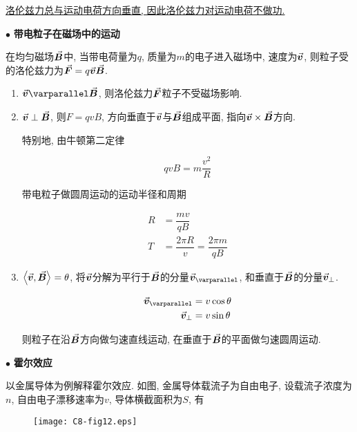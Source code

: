 \underline{洛伦兹力总与运动电荷方向垂直, 因此洛伦兹力对运动电荷不做功. }

\vskip 0.3cm

$\bullet$ \textbf{带电粒子在磁场中的运动}

在均匀磁场$\va*{B}$中, 当带电荷量为$q$, 质量为$m$的电子进入磁场中, 速度为$\va*{v}$, 则粒子受的洛伦兹力为$\va*{F} = q\va*{v}\va*{B}$. 

\begin{enumerate}[itemindent=1em]
	
	\item $\va*{v} \varparallel \va*{B}$, 则洛伦兹力$\va*{F}$粒子不受磁场影响. 
	
	\item $\va*{v} \perp \va*{B}$, 则$F = qvB$, 方向垂直于$\va*{v}$与$\va*{B}$组成平面, 指向$\va*{v} \times \va*{B}$方向. 
	
	特别地, 由牛顿第二定律
	
	\begin{equation}
		qvB = m \dfrac{v^2}{R} \label{C8-eq10}
	\end{equation}
	
	带电粒子做圆周运动的运动半径和周期
	
	\begin{align*}
		R &= \dfrac{mv}{qB} \\
		T &= \dfrac{2\pi R}{v} = \dfrac{2\pi m}{qB}
	\end{align*}
	
	\item $\left\langle \va*{v}, \va*{B} \right\rangle = \theta$, 将$\va*{v}$分解为平行于$\va*{B}$的分量$\va*{v}_{\varparallel}$, 和垂直于$\va*{B}$的分量$\va*{v}_{\bot}$. 
	
	\begin{align*}
		\va*{v}_{\varparallel} &= v \cos\theta \\
		\va*{v}_{\bot} &= v \sin\theta 
	\end{align*}
	
	则粒子在沿$\va*{B}$方向做匀速直线运动, 在垂直于$\va*{B}$的平面做匀速圆周运动. 
	
\end{enumerate}

$\bullet$ \textbf{霍尔效应}

以金属导体为例解释霍尔效应. 如图, 金属导体载流子为自由电子, 设载流子浓度为$n$, 自由电子漂移速率为$v$, 导体横截面积为$S$, 有

\begin{figure}[H]
	\centering
	\texttt{[image: C8-fig12.eps]}
\end{figure}

